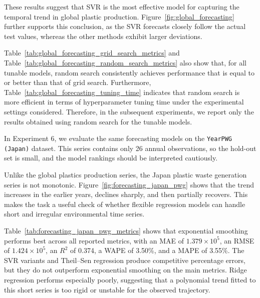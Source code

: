 These results suggest that SVR is the most effective model for capturing the temporal trend in global plastic production. Figure~\ref{fig:global_forecasting} further supports this conclusion, as the SVR forecasts closely follow the actual test values, whereas the other methods exhibit larger deviations.




Table~\ref{tab:global_forecasting_grid_search_metrics} and Table~\ref{tab:global_forecasting_random_search_metrics} also show that, for all tunable models, random search consistently achieves performance that is equal to or better than that of grid search. Furthermore, Table~\ref{tab:global_forecasting_tuning_time} indicates that random search is more efficient in terms of hyperparameter tuning time under the experimental settings considered. Therefore, in the subsequent experiments, we report only the results obtained using random search for the tunable models.


In Experiment 6, we evaluate the same forecasting models on the \texttt{YearPWG (Japan)} dataset. This series contains only 26 annual observations, so the hold-out set is small, and the model rankings should be interpreted cautiously.




Unlike the global plastics production series, the Japan plastic waste generation series is not monotonic. Figure~\ref{fig:forecasting_japan_pwg} shows that the trend increases in the earlier years, declines sharply, and then partially recovers. This makes the task a useful check of whether flexible regression models can handle short and irregular environmental time series.

Table~\ref{tab:forecasting_japan_pwg_metrics} shows that exponential smoothing performs best across all reported metrics, with an MAE of \(1.379 \times 10^5\), an RMSE of \(1.424 \times 10^5\), an \(R^2\) of 0.374, a WAPE of 3.50\%, and a MAPE of 3.55\%. The SVR variants and Theil--Sen regression produce competitive percentage errors, but they do not outperform exponential smoothing on the main metrics. Ridge regression performs especially poorly, suggesting that a polynomial trend fitted to this short series is too rigid or unstable for the observed trajectory.

